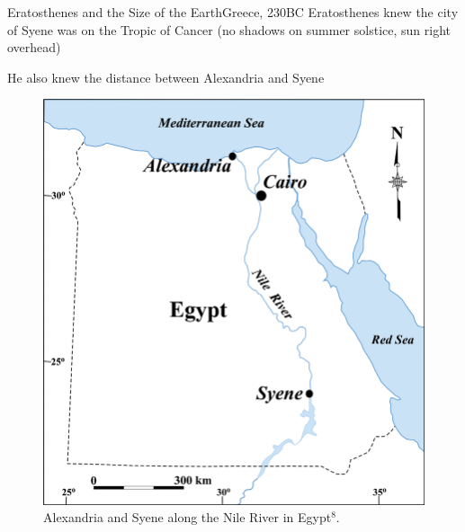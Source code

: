 \documentclass[12pt]{beamer}
\begin{document}
        \begin{frame}{Eratosthenes and the Size of the Earth}{Greece, 230BC} \centering
            Eratosthenes knew the city of Syene was on the Tropic of Cancer (no shadows on summer solstice, sun right overhead)\\ \vspace{1em}
            
            He also knew the distance between Alexandria and Syene\\

            \begin{figure}
                \includegraphics[scale=0.1, frame]{egyptmap.png}
                \caption{Alexandria and Syene along the Nile River in Egypt$^8$.}
            \end{figure}
        \end{frame}
\end{document}
